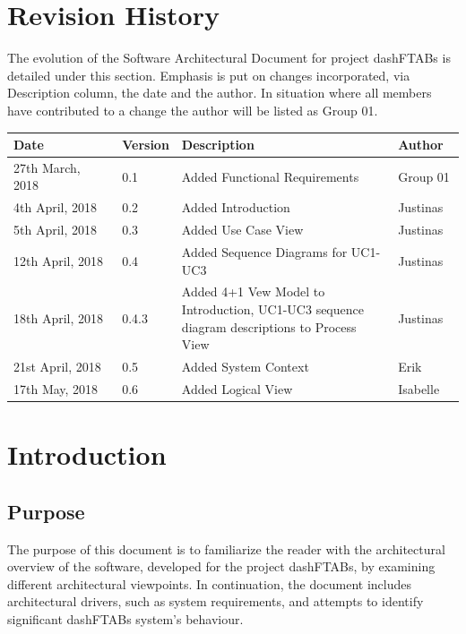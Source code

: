 \documentclass[12pt]{article}
\begin{document}
\section{Revision History}
The evolution of the Software Architectural Document for project dashFTABs is detailed under this section. Emphasis is put on changes incorporated, via Description column, the date and the author. In situation where all members have contributed to a change the author will be listed as Group 01.
\begin{longtable}{ | p{0.25\linewidth} | p{0.1\linewidth} | p{0.5\linewidth} | p{0.15\linewidth} | }\hline 
    Date & Version & Description & Author \\ \hline
   	27th March, 2018 & 0.1 & Added Functional Requirements & Group 01\\ \hline
   	4th April, 2018 & 0.2 & Added Introduction & Justinas\\ \hline
   	5th April, 2018 & 0.3 & Added Use Case View & Justinas\\ \hline
   	12th April, 2018 & 0.4 & Added Sequence Diagrams for UC1-UC3 & Justinas\\ \hline
	18th April, 2018 & 0.4.3 & Added 4+1 Vew Model to Introduction, UC1-UC3 sequence diagram descriptions to Process View & Justinas\\ \hline
	21st April, 2018 & 0.5 & Added System Context & Erik\\ \hline
	17th May, 2018 & 0.6 & Added Logical View & Isabelle\\ \hline

\end{longtable}
\pagebreak

\section{Introduction}
\subsection{Purpose}
The purpose of this document is to familiarize the reader with the architectural overview of the software, developed for the project dashFTABs, by examining different architectural viewpoints. In continuation, the document includes architectural drivers, such as system requirements, and attempts to identify significant dashFTABs system’s behaviour.\par
\end{document}
